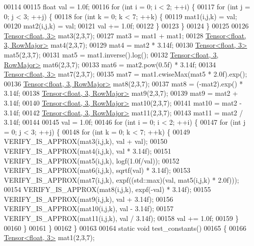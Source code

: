 \begin{DoxyCode}
00114 
00115   \textcolor{keywordtype}{float} val = 1.0f;
00116   \textcolor{keywordflow}{for} (\textcolor{keywordtype}{int} i = 0; i < 2; ++i) \{
00117     \textcolor{keywordflow}{for} (\textcolor{keywordtype}{int} j = 0; j < 3; ++j) \{
00118       \textcolor{keywordflow}{for} (\textcolor{keywordtype}{int} k = 0; k < 7; ++k) \{
00119         mat1(i,j,k) = val;
00120         mat2(i,j,k) = val;
00121         val += 1.0f;
00122       \}
00123     \}
00124   \}
00125 
00126   \hyperlink{class_eigen_1_1_tensor}{Tensor<float, 3>} mat3(2,3,7);
00127   mat3 = mat1 + mat1;
00128   \hyperlink{class_eigen_1_1_tensor}{Tensor<float, 3, RowMajor>} mat4(2,3,7);
00129   mat4 = mat2 * 3.14f;
00130   \hyperlink{class_eigen_1_1_tensor}{Tensor<float, 3>} mat5(2,3,7);
00131   mat5 = mat1.inverse().log();
00132   \hyperlink{class_eigen_1_1_tensor}{Tensor<float, 3, RowMajor>} mat6(2,3,7);
00133   mat6 = mat2.pow(0.5f) * 3.14f;
00134   \hyperlink{class_eigen_1_1_tensor}{Tensor<float, 3>} mat7(2,3,7);
00135   mat7 = mat1.cwiseMax(mat5 * 2.0f).exp();
00136   \hyperlink{class_eigen_1_1_tensor}{Tensor<float, 3, RowMajor>} mat8(2,3,7);
00137   mat8 = (-mat2).exp() * 3.14f;
00138   \hyperlink{class_eigen_1_1_tensor}{Tensor<float, 3, RowMajor>} mat9(2,3,7);
00139   mat9 = mat2 + 3.14f;
00140   \hyperlink{class_eigen_1_1_tensor}{Tensor<float, 3, RowMajor>} mat10(2,3,7);
00141   mat10 = mat2 - 3.14f;
00142   \hyperlink{class_eigen_1_1_tensor}{Tensor<float, 3, RowMajor>} mat11(2,3,7);
00143   mat11 = mat2 / 3.14f;
00144 
00145   val = 1.0f;
00146   \textcolor{keywordflow}{for} (\textcolor{keywordtype}{int} i = 0; i < 2; ++i) \{
00147     \textcolor{keywordflow}{for} (\textcolor{keywordtype}{int} j = 0; j < 3; ++j) \{
00148       \textcolor{keywordflow}{for} (\textcolor{keywordtype}{int} k = 0; k < 7; ++k) \{
00149         VERIFY\_IS\_APPROX(mat3(i,j,k), val + val);
00150         VERIFY\_IS\_APPROX(mat4(i,j,k), val * 3.14f);
00151         VERIFY\_IS\_APPROX(mat5(i,j,k), logf(1.0f/val));
00152         VERIFY\_IS\_APPROX(mat6(i,j,k), sqrtf(val) * 3.14f);
00153         VERIFY\_IS\_APPROX(mat7(i,j,k), expf((std::max)(val, mat5(i,j,k) * 2.0f)));
00154         VERIFY\_IS\_APPROX(mat8(i,j,k), expf(-val) * 3.14f);
00155         VERIFY\_IS\_APPROX(mat9(i,j,k), val + 3.14f);
00156         VERIFY\_IS\_APPROX(mat10(i,j,k), val - 3.14f);
00157         VERIFY\_IS\_APPROX(mat11(i,j,k), val / 3.14f);
00158         val += 1.0f;
00159       \}
00160     \}
00161   \}
00162 \}
00163 
00164 \textcolor{keyword}{static} \textcolor{keywordtype}{void} test\_constants()
00165 \{
00166   \hyperlink{class_eigen_1_1_tensor}{Tensor<float, 3>} mat1(2,3,7);

\end{DoxyCode}
